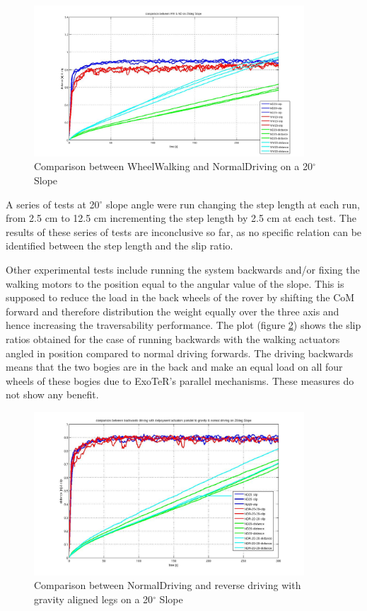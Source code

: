 \documentclass[a4paper,twocolumn]{esapub2005} %
\begin{document}
\begin{figure}[h!]
	\centering		\includegraphics[width=0.9\textwidth]{20d.JPG}	
	\caption{Comparison between WheelWalking and NormalDriving on a 20$^{\circ}$ Slope}
	\label{fig:20d}
\end{figure}



A series of tests at 20$^{\circ}$ slope angle were run changing the step length at each run, from 2.5 cm to 12.5 cm incrementing the step length by 2.5 cm at each test. The results of these series of tests are inconclusive so far, as no specific relation can be identified between the step length and the slip ratio.

Other experimental tests include running the system backwards and/or fixing the walking motors to the position equal to the angular value of the slope. This is supposed to reduce the load in the back wheels of the rover by shifting the CoM forward and therefore distribution the weight equally over the three axis and hence increasing the traversability performance. The plot (figure \ref{fig:ndr20d}) shows the slip ratios obtained for the case of running backwards with the walking actuators angled in position compared to normal driving forwards. The driving backwards means that the two bogies are in the back and make an equal load on all four wheels of these bogies due to ExoTeR's parallel mechanisms.
These measures do not show any benefit.


\begin{figure}[h!]
	\centering		\includegraphics[width=0.9\textwidth]{ndr20d.JPG}	
	\caption{Comparison between NormalDriving and reverse driving with gravity aligned legs on a 20$^{\circ}$ Slope}
	\label{fig:ndr20d}
\end{figure}
\end{document}

